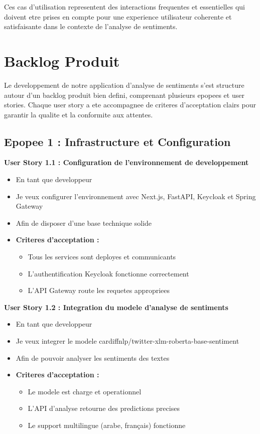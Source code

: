 Ces cas d'utilisation representent des interactions frequentes et essentielles qui doivent etre prises en compte pour une experience utilisateur coherente et satisfaisante dans le contexte de l'analyse de sentiments.

\section{Backlog Produit}

Le developpement de notre application d'analyse de sentiments s'est structure autour d'un backlog produit bien defini, comprenant plusieurs epopees et user stories. Chaque user story a ete accompagnee de criteres d'acceptation clairs pour garantir la qualite et la conformite aux attentes.

\subsection{Epopee 1 : Infrastructure et Configuration}

\textbf{User Story 1.1 : Configuration de l'environnement de developpement}
\begin{itemize}
    \item En tant que developpeur
    \item Je veux configurer l'environnement avec Next.js, FastAPI, Keycloak et Spring Gateway
    \item Afin de disposer d'une base technique solide
    \item \textbf{Criteres d'acceptation :}
    \begin{itemize}
        \item Tous les services sont deployes et communicants
        \item L'authentification Keycloak fonctionne correctement
        \item L'API Gateway route les requetes appropriees
    \end{itemize}
\end{itemize}

\textbf{User Story 1.2 : Integration du modele d'analyse de sentiments}
\begin{itemize}
    \item En tant que developpeur
    \item Je veux integrer le modele cardiffnlp/twitter-xlm-roberta-base-sentiment
    \item Afin de pouvoir analyser les sentiments des textes
    \item \textbf{Criteres d'acceptation :}
    \begin{itemize}
        \item Le modele est charge et operationnel
        \item L'API d'analyse retourne des predictions precises
        \item Le support multilingue (arabe, français) fonctionne
    \end{itemize}
\end{itemize}

